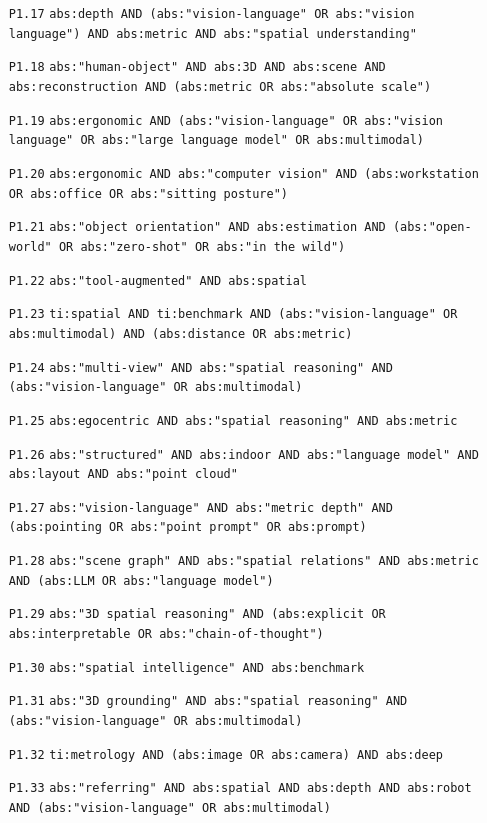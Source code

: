 {\begin{itemize}
\item[\texttt{P1.17}] \texttt{abs:depth AND (abs:"vision-language" OR abs:"vision language") AND abs:metric AND abs:"spatial understanding"}
\item[\texttt{P1.18}] \texttt{abs:"human-object" AND abs:3D AND abs:scene AND abs:reconstruction AND (abs:metric OR abs:"absolute scale")}
\item[\texttt{P1.19}] \texttt{abs:ergonomic AND (abs:"vision-language" OR abs:"vision language" OR abs:"large language model" OR abs:multimodal)}
\item[\texttt{P1.20}] \texttt{abs:ergonomic AND abs:"computer vision" AND (abs:workstation OR abs:office OR abs:"sitting posture")}
\item[\texttt{P1.21}] \texttt{abs:"object orientation" AND abs:estimation AND (abs:"open-world" OR abs:"zero-shot" OR abs:"in the wild")}
\item[\texttt{P1.22}] \texttt{abs:"tool-augmented" AND abs:spatial}
\item[\texttt{P1.23}] \texttt{ti:spatial AND ti:benchmark AND (abs:"vision-language" OR abs:multimodal) AND (abs:distance OR abs:metric)}
\item[\texttt{P1.24}] \texttt{abs:"multi-view" AND abs:"spatial reasoning" AND (abs:"vision-language" OR abs:multimodal)}
\item[\texttt{P1.25}] \texttt{abs:egocentric AND abs:"spatial reasoning" AND abs:metric}
\item[\texttt{P1.26}] \texttt{abs:"structured" AND abs:indoor AND abs:"language model" AND abs:layout AND abs:"point cloud"}
\item[\texttt{P1.27}] \texttt{abs:"vision-language" AND abs:"metric depth" AND (abs:pointing OR abs:"point prompt" OR abs:prompt)}
\item[\texttt{P1.28}] \texttt{abs:"scene graph" AND abs:"spatial relations" AND abs:metric AND (abs:LLM OR abs:"language model")}
\item[\texttt{P1.29}] \texttt{abs:"3D spatial reasoning" AND (abs:explicit OR abs:interpretable OR abs:"chain-of-thought")}
\item[\texttt{P1.30}] \texttt{abs:"spatial intelligence" AND abs:benchmark}
\item[\texttt{P1.31}] \texttt{abs:"3D grounding" AND abs:"spatial reasoning" AND (abs:"vision-language" OR abs:multimodal)}
\item[\texttt{P1.32}] \texttt{ti:metrology AND (abs:image OR abs:camera) AND abs:deep}
\item[\texttt{P1.33}] \texttt{abs:"referring" AND abs:spatial AND abs:depth AND abs:robot AND (abs:"vision-language" OR abs:multimodal)}

\end{itemize}}
